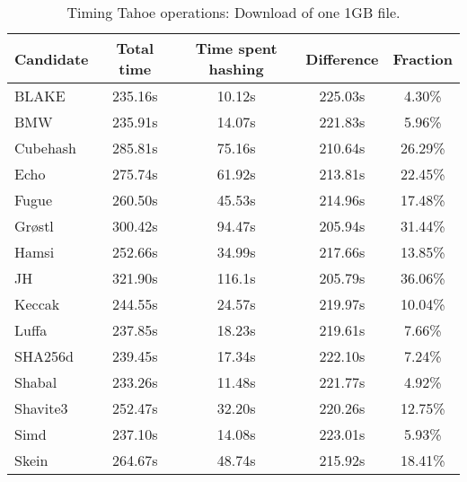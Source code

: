 \begin{table}[h]
  \centering
  \caption{Timing Tahoe operations: Download of one 1GB file.}
  \begin{tabular}{ | l | c | c | c | c | }
    \hline
    Candidate & Total time & Time spent hashing & Difference & Fraction \\ \hline
    BLAKE     &  235.16s  &  10.12s  &  225.03s  &  4.30\%   \\  \hline
    BMW       &  235.91s  &  14.07s  &  221.83s  &  5.96\%   \\  \hline
    Cubehash  &  285.81s  &  75.16s  &  210.64s  &  26.29\%  \\  \hline
    Echo      &  275.74s  &  61.92s  &  213.81s  &  22.45\%  \\  \hline
    Fugue     &  260.50s  &  45.53s  &  214.96s  &  17.48\%  \\  \hline
    Grøstl    &  300.42s  &  94.47s  &  205.94s  &  31.44\%  \\  \hline
    Hamsi     &  252.66s  &  34.99s  &  217.66s  &  13.85\%  \\  \hline
    JH        &  321.90s  &  116.1s  &  205.79s  &  36.06\%  \\  \hline
    Keccak    &  244.55s  &  24.57s  &  219.97s  &  10.04\%  \\  \hline
    Luffa     &  237.85s  &  18.23s  &  219.61s  &  7.66\%   \\  \hline
    SHA256d   &  239.45s  &  17.34s  &  222.10s  &  7.24\%   \\  \hline
    Shabal    &  233.26s  &  11.48s  &  221.77s  &  4.92\%   \\  \hline
    Shavite3  &  252.47s  &  32.20s  &  220.26s  &  12.75\%  \\  \hline
    Simd      &  237.10s  &  14.08s  &  223.01s  &  5.93\%   \\  \hline
    Skein     &  264.67s  &  48.74s  &  215.92s  &  18.41\%  \\  \hline
  \end{tabular}
  \label{tbl:hashingtimes:get1gb}
\end{table}
